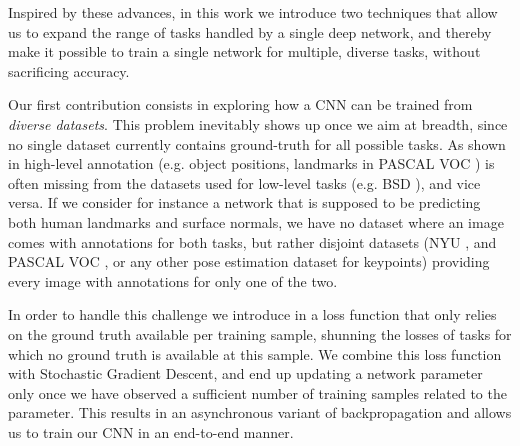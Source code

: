 \documentclass[10pt,twocolumn,letterpaper]{article}
\begin{document}

Inspired by these advances, in this work we introduce two techniques that allow us to expand the range of tasks handled by a single deep network, and thereby make it possible to train a single network for multiple, diverse tasks, without sacrificing accuracy. 

Our first contribution consists in exploring how a CNN can be trained from {\em diverse  datasets}. This problem inevitably shows up once we aim at breadth, since no single dataset currently contains ground-truth for all possible tasks. 
As shown in  high-level annotation (e.g. object positions, landmarks in PASCAL VOC \cite{pascal}) is often missing from the  datasets used for low-level tasks (e.g. BSD \cite{MFTM01}), and vice versa. If we consider for instance a network that is supposed to be predicting both human landmarks and surface normals, we have no dataset where an image comes with annotations for both tasks, but rather  disjoint datasets (NYU \cite{nyu}, and PASCAL VOC \cite{pascal}, or any other pose estimation dataset for keypoints) providing every image with annotations for only one of the two. 

In order to handle this challenge we introduce in  a loss function that only relies on the ground truth available per training sample, shunning the losses of tasks for which no ground truth is available at this sample. We combine this  loss function with Stochastic Gradient Descent, and end up updating a network parameter only once we have observed a sufficient number of  training samples related to the parameter. This results in an asynchronous variant of backpropagation and allows us to train our CNN in an end-to-end manner.



\end{document}
